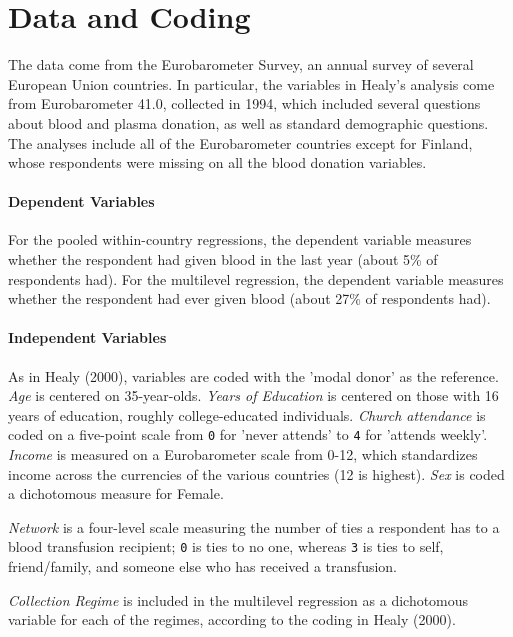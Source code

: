 \documentclass[11pt,article,oneside]{memoir}
\begin{document}
\section{Data and Coding}\label{data-and-coding}

The data come from the Eurobarometer Survey, an annual survey of several European Union countries. In particular, the variables in Healy's analysis come from Eurobarometer 41.0, collected in 1994, which included several questions
about blood and plasma donation, as well as standard demographic
questions. The analyses include all of the Eurobarometer countries
except for Finland, whose respondents were missing on all the blood
donation variables.

\paragraph{Dependent Variables}\label{dependent-variables}

For the pooled within-country regressions, the
dependent variable measures whether the respondent had given blood in
the last year (about 5\% of respondents had). For the multilevel regression, the dependent variable
measures whether the respondent had ever given blood (about 27\% of respondents had).

\paragraph{Independent Variables}\label{independent-variables}

As in Healy (2000), variables are coded with the 'modal donor' as the
reference. \emph{Age} is centered on 35-year-olds. \emph{Years of
Education} is centered on those with 16 years of education, roughly
college-educated individuals. \emph{Church attendance} is coded on a
five-point scale from \texttt{0} for 'never attends' to \texttt{4} for
'attends weekly'. \emph{Income} is measured on a Eurobarometer scale
from 0-12, which standardizes income across the currencies of the
various countries (12 is highest). \emph{Sex} is coded a dichotomous measure for Female.

\emph{Network} is a four-level scale measuring the number of ties a
respondent has to a blood transfusion recipient; \texttt{0} is ties to
no one, whereas \texttt{3} is ties to self, friend/family, and someone
else who has received a transfusion.

\emph{Collection Regime} is included in the multilevel regression as a
dichotomous variable for each of the regimes, according to the coding in Healy (2000).
\end{document}
